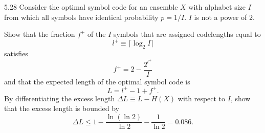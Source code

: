 \documentclass[12pt, a4paper]{article}
\begin{document}
\begin{prob}{5.28}
Consider the optimal symbol code for an ensemble $X$ with alphabet size $I$ from which all symbols have identical probability $p = 1/I$. $I$ is not a power of 2.

\noindent Show that the fraction $f^+$ of the $I$ symbols that are assigned codelengths equal to
\begin{equation}
l^+ \equiv \lceil \log_2 I \rceil
\end{equation}
satisfies
\begin{equation}
f^+ = 2 - \frac{2^{l^+}}{I}
\end{equation}
and that the expected length of the optimal symbol code is
\begin{equation}
L = l^+ - 1 + f^+.
\end{equation}
By differentiating the excess length $\Delta L \equiv L - H(X)$ with respect to $I$, show that the excess length is bounded by
\begin{equation}
\Delta L \le 1 - \frac{\ln(\ln 2)}{\ln 2} - \frac{1}{\ln 2} = 0.086.
\end{equation}
\end{prob}
\end{document}
